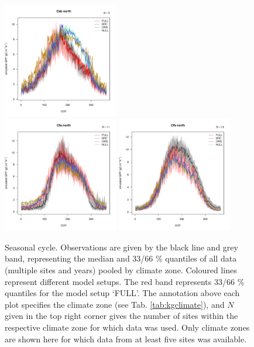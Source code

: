 \documentclass{myreport}
\begin{document}
\begin{figure}[!ht]
\includegraphics[width=0.45\textwidth]{fig/meandoy_byzone_Csb_north_.pdf}\\
\includegraphics[width=0.45\textwidth]{fig/meandoy_byzone_Cfa_north_.pdf}
\includegraphics[width=0.45\textwidth]{fig/meandoy_byzone_Cfb_north_.pdf}\\
    \caption{Seasonal cycle. Observations are given by the black line and grey band, representing the median and 33/66 \% quantiles of all data (multiple sites and years) pooled by climate zone. Coloured lines represent different model setups. The red band represents 33/66 \% quantiles for the model setup `FULL'. The annotation above each plot specifies the climate zone (see Tab. \ref{tab:kgclimate}), and $N$ given in the top right corner gives the number of sites within the respective climate zone for which data was used. Only climate zones are shown here for which data from at least five sites was available.}
    \label{fig:season}
\end{figure}
\end{document}
